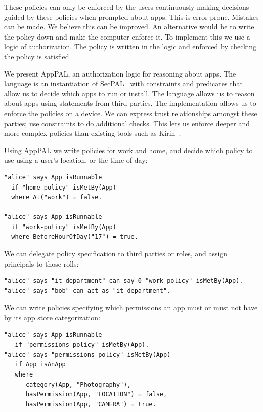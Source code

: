 \documentclass[]{llncs}
\begin{document}
These policies can only be enforced by the users continuously making decisions guided by these policies when prompted about apps.
This is error-prone.
Mistakes can be made.
We believe this can be improved.
An alternative would be to write the policy down and make the computer enforce it.
To implement this we use a logic of authorization.
The policy is written in the logic and enforced by checking the policy is satisfied.

We present AppPAL, an authorization logic for reasoning about apps.
The language is an instantiation of SecPAL~\cite{Becker:2006vh} with constraints and predicates that allow us to decide which apps to run or install.
The language allows us to reason about apps using statements from third parties.
The implementation allows us to enforce the policies on a device.
We can express trust relationships amongst these parties; use constraints to do additional checks.
This lets us enforce deeper and more complex policies than existing tools such as Kirin~\cite{Enck:2009ko}.

Using AppPAL we write policies for work and home, and decide which policy to use using a user's location, or the time of day:
\begin{lstlisting}
"alice" says App isRunnable
  if "home-policy" isMetBy(App)
  where At("work") = false.

"alice" says App isRunnable
  if "work-policy" isMetBy(App)
  where BeforeHourOfDay("17") = true.
\end{lstlisting}
We can delegate policy specification to third parties or roles, and assign principals to those rolls:
\begin{lstlisting}
"alice" says "it-department" can-say 0 "work-policy" isMetBy(App).
"alice" says "bob" can-act-as "it-department".
\end{lstlisting}
We can write policies specifying which permissions an app must or must not have by its app store categorization:
    \begin{lstlisting}
"alice" says App isRunnable
   if "permissions-policy" isMetBy(App).
"alice" says "permissions-policy" isMetBy(App)
   if App isAnApp
   where
      category(App, "Photography"),
      hasPermission(App, "LOCATION") = false,
      hasPermission(App, "CAMERA") = true.
    \end{lstlisting}
\end{document}
